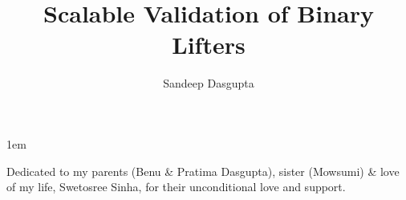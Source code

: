 \documentclass[draftthesis,tocnosub,noragright,centerchapter,fullpagesingle,12pt]{uiuc_csthesis18}
\title{Scalable Validation of Binary Lifters}
\author{Sandeep Dasgupta}
\begin{document}
%

%
\maketitle

\parindent 1em%

\frontmatter

%
\begin{abstract}

\end{abstract}


%
\begin{dedication}
Dedicated to my parents (Benu \& Pratima Dasgupta), sister (Mowsumi) \& love of my life,
Swetosree Sinha, for their unconditional love and support.
\end{dedication}

%
\begin{acknowledgments}

\end{acknowledgments}

%
\tableofcontents

\mainmatter

%









%
\appendix
%

\backmatter

%



%


\end{document}
